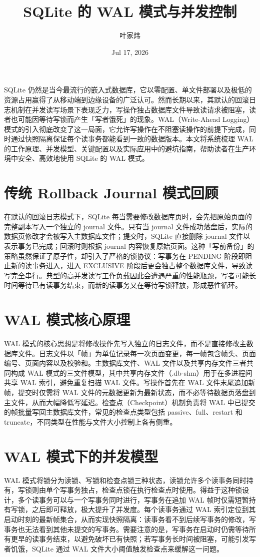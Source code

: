 \title{SQLite 的 WAL 模式与并发控制}
\author{叶家炜}
\date{Jul 17, 2026}
\maketitle
SQLite 仍然是当今最流行的嵌入式数据库，它以零配置、单文件部署以及极低的资源占用赢得了从移动端到边缘设备的广泛认可。然而长期以来，其默认的回滚日志机制在并发读写场景下表现乏力，写操作独占数据库文件导致读请求被阻塞，读者也可能因等待写锁而产生「写者饿死」的现象。WAL（Write-Ahead Logging）模式的引入彻底改变了这一局面，它允许写操作在不阻塞读操作的前提下完成，同时通过快照隔离保证每个读事务都能看到一致的数据版本。本文将系统梳理 WAL 的工作原理、并发模型、关键配置以及实际应用中的避坑指南，帮助读者在生产环境中安全、高效地使用 SQLite 的 WAL 模式。\par
\chapter{传统 Rollback Journal 模式回顾}
在默认的回滚日志模式下，SQLite 每当需要修改数据库页时，会先把原始页面的完整副本写入一个独立的 journal 文件。只有当 journal 文件成功落盘后，实际的数据页修改才会被写入主数据库文件；提交时，SQLite 直接删除 journal 文件以表示事务已完成；回滚时则根据 journal 内容恢复原始页面。这种「写前备份」的策略虽然保证了原子性，却引入了严格的锁协议：写事务在 PENDING 阶段即阻止新的读事务进入，进入 EXCLUSIVE 阶段后更会独占整个数据库文件，导致读写完全串行。典型的高并发读写工作负载因此会遭遇严重的性能瓶颈，写者可能长时间等待已有读事务结束，而新的读事务又在等待写锁释放，形成恶性循环。\par
\chapter{WAL 模式核心原理}
WAL 模式的核心思想是将修改操作先写入独立的日志文件，而不是直接修改主数据库文件。日志文件以「帧」为单位记录每一次页面变更，每一帧包含帧头、页面编号、页面内容以及校验和。主数据库文件、WAL 文件以及共享内存文件三者共同构成 WAL 模式的三文件模型，其中共享内存文件（.db-shm）用于在多进程间共享 WAL 索引，避免重复扫描 WAL 文件。写操作首先在 WAL 文件末尾追加新帧，提交时仅需将 WAL 文件的元数据更新为最新状态，而不必等待数据页落盘到主文件，从而大幅降低写延迟。检查点（Checkpoint）机制负责将 WAL 中已提交的帧批量写回主数据库文件，常见的检查点类型包括 passive、full、restart 和 truncate，不同类型在性能与文件大小控制上各有侧重。\par
\chapter{WAL 模式下的并发模型}
WAL 模式将锁分为读锁、写锁和检查点锁三种状态，读锁允许多个读事务同时持有，写锁则由单个写事务独占，检查点锁在执行检查点时使用。得益于这种锁设计，多个读事务可以与一个写事务同时进行，写事务在追加 WAL 帧时仅需短暂持有写锁，之后即可释放，极大提升了并发度。每个读事务通过 WAL 索引定位到其启动时刻的最新帧集合，从而实现快照隔离：读事务看不到后续写事务的修改，写事务也无法看到其他未提交的写事务。需要注意的是，写事务在启动时仍需等待所有更早的读事务结束，以避免破坏已有快照；若写事务长时间被阻塞，可能引发写者饥饿，SQLite 通过 WAL 文件大小阈值触发检查点来缓解这一问题。\par
